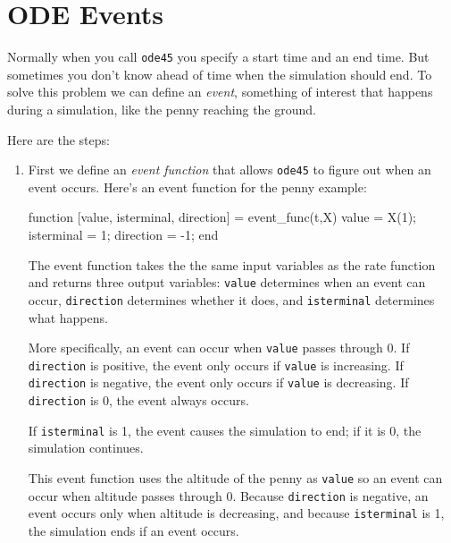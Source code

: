 \section{ODE Events}
\label{events}


Normally when you call \lstinline{ode45} you specify a start time and
an end time.  But sometimes you don't know ahead of time when the
simulation should end.  To solve this problem we can define an \emph{event}, 
something of interest that happens during a simulation,
like the penny reaching the ground.

Here are the steps: 


\begin{enumerate}

\item First we define an \emph{event function} that allows \lstinline{ode45} to figure out when
an event occurs.  Here's an event function for the penny example:

\begin{code}
function [value, isterminal, direction] = event_func(t,X)
    value = X(1);
    isterminal = 1;
    direction = -1;
end
\end{code}

The event function takes the the same input variables as the rate function and returns three output variables: \lstinline{value} determines when an event can occur, \lstinline{direction} determines whether it does, and \lstinline{isterminal} determines what happens.

More specifically, an event can occur when \lstinline{value} passes through 0.
If \lstinline{direction} is positive, the event only occurs if \lstinline{value} is increasing.
If \lstinline{direction} is negative, the event only occurs if \lstinline{value} is decreasing.
If \lstinline{direction} is 0, the event always occurs.

If \lstinline{isterminal} is 1, the event causes the simulation to end; if it is 0, the simulation continues.

This event function uses the altitude of the penny as \lstinline{value} so an event can occur when altitude passes through 0.  
Because \lstinline{direction} is negative, an event occurs only when altitude is decreasing, and
because \lstinline{isterminal} is 1, the simulation ends if an event occurs.



\end{enumerate}
